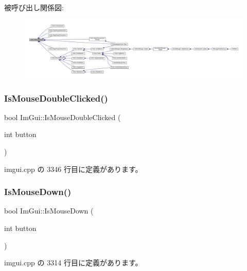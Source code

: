 被呼び出し関係図\+:
\nopagebreak
\begin{figure}[H]
\begin{center}
\leavevmode
\includegraphics[width=350pt]{namespace_im_gui_a22b689cf4cf519590c2e2ad4f5462f29_icgraph}
\end{center}
\end{figure}
\mbox{\label{namespace_im_gui_a0d39701e7a0d7629e1b96b68e935542e}} 
\subsubsection{\texorpdfstring{Is\+Mouse\+Double\+Clicked()}{IsMouseDoubleClicked()}}
{\footnotesize\ttfamily bool Im\+Gui\+::\+Is\+Mouse\+Double\+Clicked (\begin{DoxyParamCaption}\item[{int}]{button }\end{DoxyParamCaption})}



 imgui.\+cpp の 3346 行目に定義があります。

\mbox{\label{namespace_im_gui_a8ddf4d05de8ab8b9aa70906a22a9973e}} 
\subsubsection{\texorpdfstring{Is\+Mouse\+Down()}{IsMouseDown()}}
{\footnotesize\ttfamily bool Im\+Gui\+::\+Is\+Mouse\+Down (\begin{DoxyParamCaption}\item[{int}]{button }\end{DoxyParamCaption})}



 imgui.\+cpp の 3314 行目に定義があります。

\mbox{\label{namespace_im_gui_a7905828a024c6c005fa1887e62235ca4}} 
